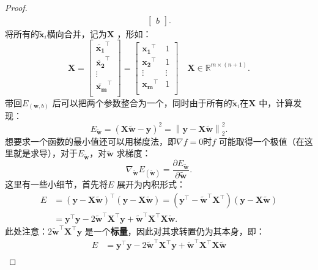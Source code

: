 \begin{proof}
\begin{align*}
\begin{bmatrix}
            b
        \end{bmatrix}
    .\end{align*}
    将所有的$\bm{\widetilde{x}}_i$横向合并，记为$\bm{X}$ ，形如：\[
        \bm{X} = \begin{bmatrix}
            \bm{\widetilde{x_1}}^\top \\
            \bm{\widetilde{x_2}}^\top \\
            \vdots\\
            \bm{\widetilde{x_m}}^\top \\
        \end{bmatrix} = \begin{bmatrix}
        \bm{x_1}^\top &1\\
        \bm{x_2}^\top &1\\
        \vdots&\vdots\\
        \bm{x_m}^\top &1\\
        \end{bmatrix} \quad \bm{X} \in \mathbb{R}^{m \times \left( n+1 \right)}
    .\]
    带回$E_{\left( \bm{w},b \right)}$ 后可以把两个参数整合为一个，同时由于所有的$\bm{\widetilde{x}}_i$在$\bm{X}$ 中，计算发现：\[
        E_{\bm{\widetilde{w}}} = \left( \bm{X}\bm{\widetilde{w}} -\bm{y}\right)^2 = \left\lVert \bm{y} - \bm{X}\bm{\widetilde{w}} \right\rVert_{2}^{2}
    .\]
    想要求一个函数的最小值还可以用梯度法，即$\nabla f=0$时$f$ 可能取得一个极值（在这里就是求导），对于$E_{\bm{\widetilde{w}}}$，对$\bm{\widetilde{w}}$ 求梯度：\[
        \nabla _{\bm{\widetilde{w}}}E_{\left( \bm{\widetilde{w}} \right)} = \frac{\partial E_{\bm{\widetilde{w}}}}{\partial \bm{\widetilde{w}}}
    .\]
    这里有一些小细节，首先将$E$ 展开为内积形式：
    \begin{align*}
        E &= \left( \bm{y}-\bm{X}\bm{\widetilde{w}} \right)^\top\left( \bm{y}-\bm{X}\bm{\widetilde{w}} \right) = \left( \bm{y}^\top -\bm{\widetilde{w}}^\top \bm{X}^\top  \right) \left( \bm{y}-\bm{X}\bm{\widetilde{w}} \right)\\
          &= \bm{y}^\top \bm{y}-2\bm{\widetilde{w}}^\top \bm{X}^\top \bm{y} + \bm{\widetilde{w}}^\top \bm{X}^\top \bm{X}\bm{\widetilde{w}}
    .\end{align*}
    此处注意：$2\bm{\widetilde{w}}^\top \bm{X}^\top \bm{y}$ 是一个\textbf{标量}，因此对其求转置仍为其本身，即：
    \begin{align*}
        E &= \bm{y}^\top \bm{y} - 2\bm{\widetilde{w}}^\top \bm{X}^\top \bm{y} + \bm{\widetilde{w}}^\top \bm{X}^\top \bm{X}\bm{\widetilde{w}}\\

\end{align*}
\end{proof}
